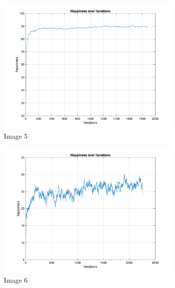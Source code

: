 \documentclass[unicode,11pt,a4paper,oneside,numbers=endperiod,openany]{scrartcl}
\begin{document}
\begin{figure}[H]
\begin{subfigure}[b]{0.4\textwidth}
        \includegraphics[width=\textwidth]{Convergence/ConvergenceH5Random_1.png}
        \caption{Image 5}
        \label{fig:image5}
      \end{subfigure}
      \begin{subfigure}[b]{0.4\textwidth}
        
        \includegraphics[width=\textwidth]{Convergence/ConvergenceH6Random_1.png}
        \caption{Image 6}
        \label{fig:image6}
      \end{subfigure}
      
      \begin{subfigure}[b]{0.4\textwidth}
        

\end{subfigure}
\end{figure}
\end{document}
